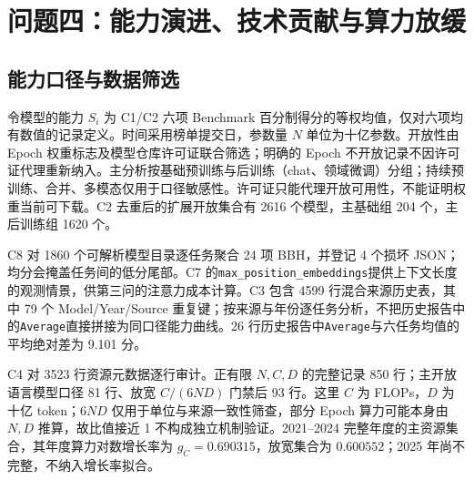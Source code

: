 \section{问题四：能力演进、技术贡献与算力放缓}
\label{sec:q4}

\subsection{能力口径与数据筛选}
令模型的能力 $S_i$ 为 C1/C2 六项 Benchmark 百分制得分的等权均值，仅对六项均有数值的记录定义。时间采用榜单提交日，参数量 $N$ 单位为十亿参数。开放性由 Epoch 权重标志及模型仓库许可证联合筛选；明确的 Epoch 不开放记录不因许可证代理重新纳入。主分析按基础预训练与后训练（chat、领域微调）分组；持续预训练、合并、多模态仅用于口径敏感性。许可证只能代理开放可用性，不能证明权重当前可下载。C2 去重后的扩展开放集合有 2616 个模型，主基础组 204 个，主后训练组 1620 个。

C8 对 1860 个可解析模型目录逐任务聚合 24 项 BBH，并登记 4 个损坏 JSON；均分会掩盖任务间的低分尾部。C7 的\texttt{max\_position\_embeddings}提供上下文长度的观测情景，供第三问的注意力成本计算。C3 包含 4599 行混合来源历史表，其中 79 个 Model/Year/Source 重复键；按来源与年份逐任务分析，不把历史报告中的\texttt{Average}直接拼接为同口径能力曲线。26 行历史报告中\texttt{Average}与六任务均值的平均绝对差为 9.101 分。

C4 对 3523 行资源元数据逐行审计。正有限 $N,C,D$ 的完整记录 850 行；主开放语言模型口径 81 行、放宽 $C/(6ND)$ 门禁后 93 行。这里 $C$ 为 FLOPs，$D$ 为十亿 token；$6ND$ 仅用于单位与来源一致性筛查，部分 Epoch 算力可能本身由 $N,D$ 推算，故比值接近 1 不构成独立机制验证。2021--2024 完整年度的主资源集合，其年度算力对数增长率为 $g_C=0.690315$，放宽集合为 $0.600552$；2025 年尚不完整，不纳入增长率拟合。

